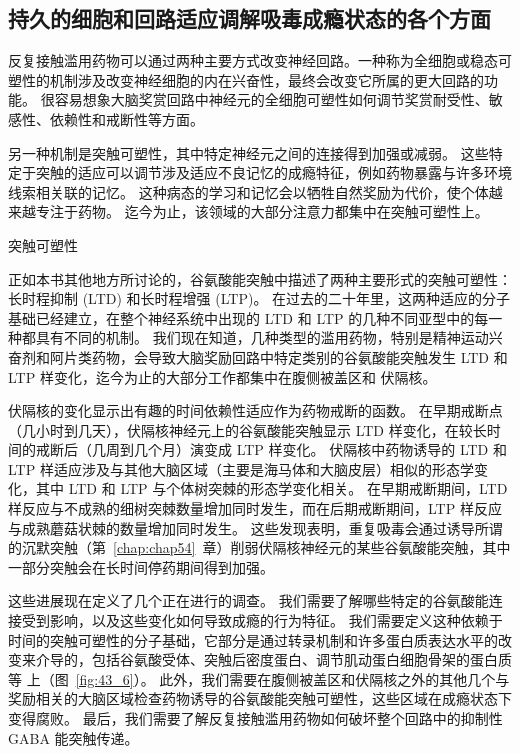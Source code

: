 \subsection{持久的细胞和回路适应调解吸毒成瘾状态的各个方面}

反复接触滥用药物可以通过两种主要方式改变神经回路。一种称为全细胞或稳态可塑性的机制涉及改变神经细胞的内在兴奋性，最终会改变它所属的更大回路的功能。
很容易想象大脑奖赏回路中神经元的全细胞可塑性如何调节奖赏耐受性、敏感性、依赖性和戒断性等方面。


另一种机制是突触可塑性，其中特定神经元之间的连接得到加强或减弱。
这些特定于突触的适应可以调节涉及适应不良记忆的成瘾特征，例如药物暴露与许多环境线索相关联的记忆。
这种病态的学习和记忆会以牺牲自然奖励为代价，使个体越来越专注于药物。
迄今为止，该领域的大部分注意力都集中在突触可塑性上。


突触可塑性

正如本书其他地方所讨论的，谷氨酸能突触中描述了两种主要形式的突触可塑性：
长时程抑制 (LTD) 和长时程增强 (LTP)。
在过去的二十年里，这两种适应的分子基础已经建立，在整个神经系统中出现的 LTD 和 LTP 的几种不同亚型中的每一种都具有不同的机制。
我们现在知道，几种类型的滥用药物，特别是精神运动兴奋剂和阿片类药物，会导致大脑奖励回路中特定类别的谷氨酸能突触发生 LTD 和 LTP 样变化，迄今为止的大部分工作都集中在腹侧被盖区和 伏隔核。


伏隔核的变化显示出有趣的时间依赖性适应作为药物戒断的函数。
在早期戒断点（几小时到几天），伏隔核神经元上的谷氨酸能突触显示 LTD 样变化，在较长时间的戒断后（几周到几个月）演变成 LTP 样变化。
伏隔核中药物诱导的 LTD 和 LTP 样适应涉及与其他大脑区域（主要是海马体和大脑皮层）相似的形态学变化，其中 LTD 和 LTP 与个体树突棘的形态学变化相关。
在早期戒断期间，LTD 样反应与不成熟的细树突棘数量增加同时发生，而在后期戒断期间，LTP 样反应与成熟蘑菇状棘的数量增加同时发生。 这些发现表明，重复吸毒会通过诱导所谓的沉默突触（第~\ref{chap:chap54}~章）削弱伏隔核神经元的某些谷氨酸能突触，其中一部分突触会在长时间停药期间得到加强。


这些进展现在定义了几个正在进行的调查。
我们需要了解哪些特定的谷氨酸能连接受到影响，以及这些变化如何导致成瘾的行为特征。
我们需要定义这种依赖于时间的突触可塑性的分子基础，它部分是通过转录机制和许多蛋白质表达水平的改变来介导的，包括谷氨酸受体、突触后密度蛋白、调节肌动蛋白细胞骨架的蛋白质等 上（图~\ref{fig:43_6}）。
此外，我们需要在腹侧被盖区和伏隔核之外的其他几个与奖励相关的大脑区域检查药物诱导的谷氨酸能突触可塑性，这些区域在成瘾状态下变得腐败。
最后，我们需要了解反复接触滥用药物如何破坏整个回路中的抑制性 GABA 能突触传递。


